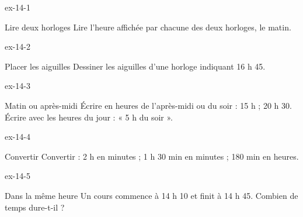 \clearpage{}
\begin{blocLivre}{ex-14-1}\begin{exercice}[1]{Lire deux horloges}
Lire l’heure affichée par chacune des deux horloges, le matin.
\label{fig-ex-14-1}
\end{exercice}\end{blocLivre}
\begin{blocLivre}{ex-14-2}\begin{exercice}[1]{Placer les aiguilles}
Dessiner les aiguilles d’une horloge indiquant 16 h 45.
\label{fig-ex-14-2}
\end{exercice}\end{blocLivre}
\begin{blocLivre}{ex-14-3}\begin{exercice}[1]{Matin ou après-midi}
Écrire en heures de l’après-midi ou du soir : 15 h ; 20 h 30. Écrire avec les heures du jour : « 5 h du soir ».
\end{exercice}\end{blocLivre}
\begin{blocLivre}{ex-14-4}\begin{exercice}[1]{Convertir}
Convertir : 2 h en minutes ; 1 h 30 min en minutes ; 180 min en heures.
\end{exercice}\end{blocLivre}
\begin{blocLivre}{ex-14-5}\begin{exercice}[1]{Dans la même heure}
Un cours commence à 14 h 10 et finit à 14 h 45. Combien de temps dure-t-il ?
\end{exercice}\end{blocLivre}

